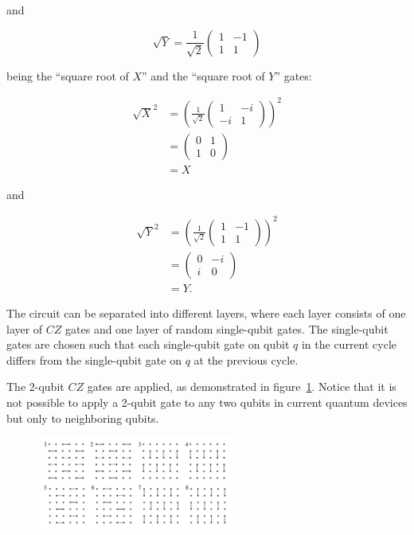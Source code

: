and

\begin{equation}
  \sqrt{Y} = \frac{1}{\sqrt{2}} \begin{pmatrix}
    1 & -1  \\
    1 & 1 
  \end{pmatrix}
\end{equation}

being the ``square root of $X$'' and the ``square root of $Y$'' gates:

\begin{align}
  \sqrt{X}^2 &= (\frac{1}{\sqrt{2}} \begin{pmatrix}
    1 & - i \\
    - i & 1
  \end{pmatrix})^2 \\
  &= \begin{pmatrix}
    0 & 1 \\
    1 & 0
  \end{pmatrix} \\
  &= X
\end{align}

and

\begin{align}
  \sqrt{Y}^2 &= (\frac{1}{\sqrt{2}} \begin{pmatrix}
    1 & -1 \\
    1 & 1
  \end{pmatrix})^2 \\
  &= \begin{pmatrix}
    0 & -i \\
    i & 0
  \end{pmatrix} \\
  &= Y.
\end{align}

The circuit can be separated into different layers, where each layer consists of one
layer of $CZ$ gates and one layer of random single-qubit gates. The single-qubit
gates are chosen such that each single-qubit gate on qubit $q$ in the current
cycle differs from the single-qubit gate on $q$ at the previous cycle.

The 2-qubit $CZ$ gates are applied, as demonstrated in figure~\ref{fig:czgates}.
Notice that it is not possible to apply a 2-qubit gate to any two qubits in
current quantum devices but only to neighboring qubits.

\begin{figure}[H]
  \centering
  \label{fig:czgates}
  \includegraphics[width=0.58\textwidth]{figures/cz_order}
\end{figure}

